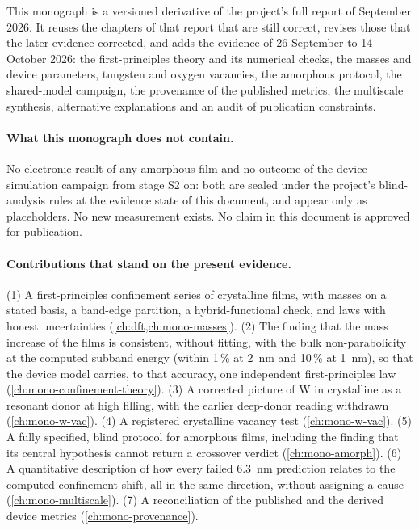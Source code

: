 This monograph is a versioned derivative of the project's full report of September 2026. It reuses the chapters of that
report that are still correct, revises those that the later evidence corrected, and adds the evidence of 26 September to
14 October 2026: the first-principles theory and its numerical checks, the masses and device parameters, tungsten and
oxygen vacancies, the amorphous protocol, the shared-model campaign, the provenance of the published metrics, the
multiscale synthesis, alternative explanations and an audit of publication constraints.

\paragraph{What this monograph does not contain.} No electronic result of any amorphous film and no outcome of the
device-simulation campaign from stage S2 on: both are sealed under the project's blind-analysis rules at the evidence
state of this document, and appear only as placeholders. No new measurement exists. No claim in this document is approved
for publication.

\paragraph{Contributions that stand on the present evidence.} (1) A first-principles confinement series of crystalline
\InO{} films, with masses on a stated basis, a band-edge partition, a hybrid-functional check, and laws with honest
uncertainties (\cref{ch:dft,ch:mono-masses}). (2) The finding that the mass increase of the films is consistent, without fitting,
with the bulk non-parabolicity at the computed subband energy (within 1\,\% at 2~nm and 10\,\% at 1~nm), so that the
device model carries, to that accuracy, one independent first-principles law (\cref{ch:mono-confinement-theory}). (3) A corrected picture of W in crystalline
\InO{} as a resonant donor at high filling, with the earlier deep-donor reading withdrawn (\cref{ch:mono-w-vac}).
(4) A registered crystalline vacancy test (\cref{ch:mono-w-vac}). (5) A fully specified, blind protocol for amorphous
films, including the finding that its central hypothesis cannot return a crossover verdict (\cref{ch:mono-amorph}).
(6) A quantitative description of how every failed 6.3~nm prediction relates to the computed confinement shift, all in
the same direction, without assigning a cause (\cref{ch:mono-multiscale}).
(7) A reconciliation of the published and the derived device metrics (\cref{ch:mono-provenance}).

